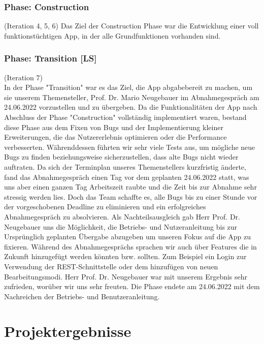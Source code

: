 \documentclass[10pt]{article}
\begin{document}
\subsubsection{Phase: Construction}
(Iteration 4, 5, 6)
Das Ziel der Construction Phase war die Entwicklung einer voll funktionstüchtigen App, in der alle Grundfunktionen vorhanden sind.
\subsubsection{Phase: Transition [LS]}
(Iteration 7) \\
In der Phase "Transition" war es das Ziel, die App abgabebereit zu machen, um sie unserem Themensteller,
Prof. Dr. Mario Neugebauer im Abnahmegespräch am 24.06.2022 vorzustellen
und zu übergeben. Da die Funktionalitäten der App nach Abschluss der Phase "Construction" vollständig implementiert waren,
bestand diese Phase aus dem Fixen von Bugs und der 
Implementierung kleiner Erweiterungen, die das Nutzererlebnis optimieren oder die Performance verbesserten. 
Währenddessen führten wir sehr viele Tests aus, um mögliche neue Bugs
zu finden beziehungsweise sicherzustellen, dass alte Bugs nicht wieder auftraten. 
Da sich der Terminplan unseres Themenstellers kurzfristig änderte, fand das Abnahmegespräch einen
Tag vor dem geplanten 24.06.2022 statt, was uns aber einen ganzen Tag Arbeitszeit raubte 
und die Zeit bis zur Abnahme sehr stressig werden lies. 
Doch das Team schaffte es, alle Bugs bis zu einer Stunde vor der vorgeschobenen Deadline zu eliminieren 
und ein erfolgreiches Abnahmegespräch zu absolvieren. Als Nachteilsausgleich gab
Herr Prof. Dr. Neugebauer uns die Möglichkeit, die Betriebs- und Nutzeranleitung bis zur Ursprünglich geplanten
Übergabe abzugeben um unseren Fokus auf die App zu fixieren.
Während des Abnahmegesprächs sprachen wir auch über Features die in Zukunft hinzugefügt werden könnten bzw. sollten. 
Zum Beispiel ein Login zur Verwendung der REST-Schnittstelle oder dem hinzufügen von neuen Bearbeitungsmodi.
Herr Prof. Dr. Neugebauer war mit unserem Ergebnis sehr zufrieden, worüber wir uns sehr freuten.
Die Phase endete am 24.06.2022 mit dem Nachreichen der Betriebs- und Benutzeranleitung. 

\section{Projektergebnisse}
\end{document}
